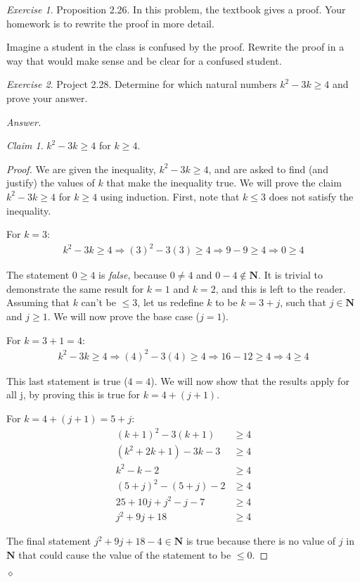 \documentclass[12pt,oneside]{amsart}
\theoremstyle{remark}
\newtheorem{exer}{Exercise}
\newtheorem{claim}{Claim}[exer]
\newcommand{\bfN}{\mathbf{N}}
\newenvironment{answer}{\bigskip\noindent\emph{Answer.}}{\hfill$\diamond$\newline}
\begin{document}
\newpage
\begin{exer}
Proposition 2.26. In this problem, the textbook gives a proof. Your homework is to rewrite the proof in more detail.

Imagine a student in the class is confused by the proof. Rewrite the proof in a way that would make sense and be clear for a confused student.
\end{exer}

\newpage
\begin{exer}
Project 2.28. Determine for which natural numbers $k^2 - 3k \geq 4$
and prove your answer.
\end{exer}

\begin{answer}
\begin{claim}
$k^2 - 3k \geq 4$ for $k \geq 4$.
\end{claim}

\begin{proof}
We are given the inequality, $k^2 - 3k \geq 4$, and are asked to find (and justify) the values of $k$ that make the inequality true. We will prove the claim $k^2 - 3k \geq 4$ for $k \geq 4$ using induction. First, note that $k \leq 3$ does not satisfy the inequality.

For $k = 3$:
\begin{align*}
    k^2 - 3k \geq 4 \Rightarrow
(3)^2 - 3(3) \geq 4 \Rightarrow
       9 - 9 \geq 4 \Rightarrow
           0 \geq 4
\end{align*}

The statement $0 \geq 4$ is \emph{false}, because $0 \neq 4$ and $0 - 4 \notin \bfN$. It is trivial to demonstrate the same result for $k = 1$ and $k = 2$, and this is left to the reader. Assuming that $k$ can't be $\leq 3$, let us redefine $k$ to be $k = 3 + j$, such that $j \in \bfN$ and $j \geq 1$. We will now prove the base case ($j = 1$).

For $k = 3 + 1 = 4$:
\begin{align*}
    k^2 - 3k \geq 4 \Rightarrow
(4)^2 - 3(4) \geq 4 \Rightarrow
     16 - 12 \geq 4 \Rightarrow
           4 \geq 4
\end{align*}

This last statement is true ($4 = 4$). We will now show that the results apply for all j, by proving this is true for $k = 4 + (j + 1)$.

For $k = 4 + (j + 1) = 5 + j$:
\begin{align*}
   (k + 1)^2 - 3(k + 1) &\geq 4 \\
(k^2 + 2k + 1) - 3k - 3 &\geq 4 \\
            k^2 - k - 2 &\geq 4 \\
(5 + j)^2 - (5 + j) - 2 &\geq 4 \\
 25 + 10j + j^2 - j - 7 &\geq 4 \\
          j^2 + 9j + 18 &\geq 4
\end{align*}

The final statement $j^2 + 9j + 18 - 4 \in \bfN$ is true because there is no value of $j$ in $\bfN$ that could cause the value of the statement to be $\leq 0$.
\end{proof}
\end{answer}
\end{document}

